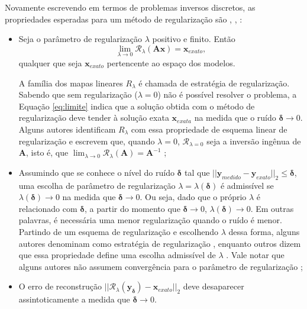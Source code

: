 Novamente escrevendo em termos de problemas inversos discretos, as propriedades esperadas para um método de regularização são \cite[pág. 5]{Daubechies2016}, \cite[pág. 50]{engl1996regularization}, \cite[pág. 48] {Mueller2012}:
\begin{itemize}
\item Seja o parâmetro de regularização $\lambda$ positivo e finito. Então 
\begin{equation}
\lim_{\lambda \to 0} \mathcal{R}_{\lambda}(\mathbf{A} \mathbf{x}) = \mathbf{x}_{exato},
\label{eq:limite}
\end{equation}
qualquer que seja $\mathbf{x}_{exato}$ pertencente ao espaço dos modelos. 

A família dos mapas lineares ${R}_{\lambda}$ é chamada de estratégia de regularização. Sabendo que sem regularização ($\lambda = 0$) não é possível resolver o problema, a Equação \eqref{eq:limite} indica que a solução obtida com o método de regularização deve tender à solução exata $\mathbf{x}_{exata}$ na medida que o ruído $\bm{\delta} \rightarrow 0$. Alguns autores identificam ${R}_{\lambda}$ com essa propriedade de esquema linear de regularização e escrevem que, quando $\lambda=0$, $\mathcal{R}_{\lambda = 0}$ seja a inversão ingênua de $\mathbf{A}$, isto é, que $\lim_{\lambda \to 0} \mathcal{R}_{\lambda}(\mathbf{A}) = \mathbf{A}^{-1}$ \cite[pág. 58]{Neto2005};

\item Assumindo que se conhece o nível do ruído $\bm{\delta}$ tal que $ \vert \vert \mathbf{y}_{medido} - \mathbf{y}_{exato} \vert \vert_2 \leq \bm{\delta}$, uma escolha de parâmetro de regularização $\lambda = \lambda(\bm{\delta})$ é admissível se $\lambda(\bm{\delta}) \rightarrow 0$ na medida que $\bm{\delta} \rightarrow 0$. Ou seja, dado que o próprio $\lambda$ é relacionado com $\bm{\delta}$, a partir do momento que $\bm{\delta} \rightarrow 0$, $\lambda(\bm{\delta}) \rightarrow 0$. Em outras palavras, é necessária uma menor regularização quando o ruído é menor. Partindo de um esquema de regularização e escolhendo $\lambda$ dessa forma, alguns autores denominam como estratégia de regularização \cite[pág. 64]{Neto2005}, enquanto outros dizem que essa propriedade define uma escolha admissível de $\lambda$ \cite[pág. 48] {Mueller2012}. Vale notar que alguns autores não assumem convergência para o parâmetro de regularização \cite[pág. 24]{Benning2018}; 
 
\item O erro de reconstrução $\vert \vert \mathcal{R}_{\lambda}(\mathbf{y}_{\bm{\delta}}) - \mathbf{x}_{exato} \vert \vert_2$ deve desaparecer assintoticamente a medida que $\bm{\delta} \rightarrow 0$. 
\end{itemize}

